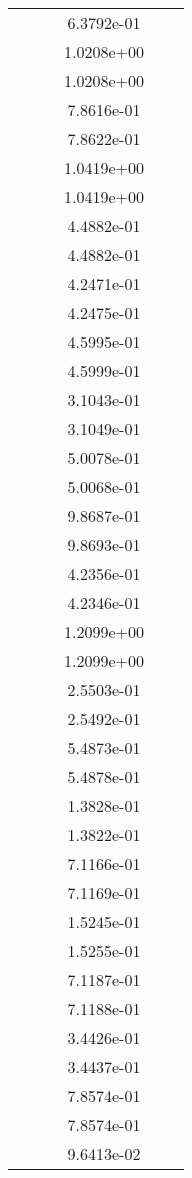 \begin{xltabular}{\textwidth}{r|rS[table-format=1.3e+2]S[table-format=1.4e+2]S[table-format=1.4e+2]S[table-format=-1.5]}
&  &  & 6.3792e-01 & & \\
&  &  & 1.0208e+00 & & \\
&  &  & 1.0208e+00 & & \\
&  &  & 7.8616e-01 & & \\
&  &  & 7.8622e-01 & & \\
&  &  & 1.0419e+00 & & \\
&  &  & 1.0419e+00 & & \\
&  &  & 4.4882e-01 & & \\
&  &  & 4.4882e-01 & & \\
&  &  & 4.2471e-01 & & \\
&  &  & 4.2475e-01 & & \\
&  &  & 4.5995e-01 & & \\
&  &  & 4.5999e-01 & & \\
&  &  & 3.1043e-01 & & \\
&  &  & 3.1049e-01 & & \\
&  &  & 5.0078e-01 & & \\
&  &  & 5.0068e-01 & & \\
&  &  & 9.8687e-01 & & \\
&  &  & 9.8693e-01 & & \\
&  &  & 4.2356e-01 & & \\
&  &  & 4.2346e-01 & & \\
&  &  & 1.2099e+00 & & \\
&  &  & 1.2099e+00 & & \\
&  &  & 2.5503e-01 & & \\
&  &  & 2.5492e-01 & & \\
&  &  & 5.4873e-01 & & \\
&  &  & 5.4878e-01 & & \\
&  &  & 1.3828e-01 & & \\
&  &  & 1.3822e-01 & & \\
&  &  & 7.1166e-01 & & \\
&  &  & 7.1169e-01 & & \\
&  &  & 1.5245e-01 & & \\
&  &  & 1.5255e-01 & & \\
&  &  & 7.1187e-01 & & \\
&  &  & 7.1188e-01 & & \\
&  &  & 3.4426e-01 & & \\
&  &  & 3.4437e-01 & & \\
&  &  & 7.8574e-01 & & \\
&  &  & 7.8574e-01 & & \\
&  &  & 9.6413e-02 & & \\

\end{xltabular}
